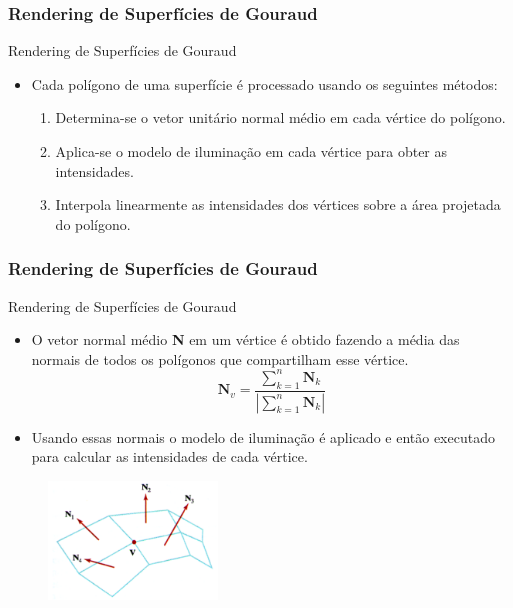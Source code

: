 \documentclass{beamer}
\begin{document}
\begin{frame}
\frametitle{Rendering de Superfícies de Gouraud}

		\begin{block}{Rendering de Superfícies de Gouraud}
		\begin{itemize}
			\item Cada polígono de uma superfície é processado usando os seguintes métodos:
			\begin{enumerate}
				\item Determina-se o vetor unitário normal médio em cada vértice do polígono.
				\item Aplica-se o modelo de iluminação em cada vértice para obter as intensidades.
				\item Interpola linearmente as intensidades dos vértices sobre a área projetada do polígono.
			\end{enumerate}
		\end{itemize}
	\end{block}
	
\end{frame}


\begin{frame}
\frametitle{Rendering de Superfícies de Gouraud}

		\begin{block}{Rendering de Superfícies de Gouraud}
		\begin{itemize}
			\item O vetor normal médio \textbf{N} em um vértice é obtido fazendo a média das normais de todos os polígonos que compartilham esse vértice.
			\begin{equation*}
				\textbf{N}_v = \frac{\sum_{k=1}^n \textbf{N}_k}{|\sum_{k=1}^n \textbf{N}_k|}
			\end{equation*}
			\item Usando essas normais o modelo de iluminação é aplicado e então executado para calcular as intensidades de cada vértice.
		\end{itemize}
	\end{block}
	
	\begin{figure}[!h]
			\begin{center}
			\includegraphics[width=0.4\textwidth]{Figures/NorMea}
			\end{center}
		\end{figure}
	
\end{frame}
\end{document}

